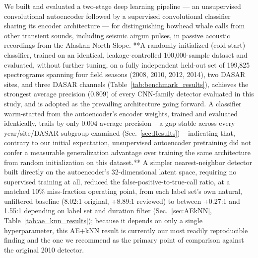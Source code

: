 \documentclass[preprint,NumberedRefs]{JASAnew}
\begin{document}
We built and evaluated a two-stage deep learning pipeline — an unsupervised
convolutional autoencoder followed by a supervised convolutional classifier
sharing its encoder architecture — for distinguishing bowhead whale calls
from other transient sounds, including seismic airgun pulses, in passive
acoustic recordings from the Alaskan North Slope. **A randomly-initialized
(cold-start) classifier, trained on an identical, leakage-controlled
100,000-sample dataset and evaluated, without further tuning, on a fully
independent held-out set of 199,825 spectrograms spanning four field seasons
(2008, 2010, 2012, 2014), two DASAR sites, and three DASAR channels
(Table~\ref{tab:benchmark_results}), achieves the strongest average
precision (0.809) of every CNN-family detector evaluated in this study, and
is adopted as the prevailing architecture going forward. A classifier
warm-started from the autoencoder's encoder weights, trained and evaluated
identically, trails by only 0.004 average precision -- a gap stable across
every year/site/DASAR subgroup examined (Sec.~\ref{sec:Results}) --
indicating that, contrary to our initial expectation, unsupervised
autoencoder pretraining did not confer a measurable generalization advantage
over training the same architecture from random initialization on this
dataset.** A simpler nearest-neighbor detector built
directly on the autoencoder's 32-dimensional latent space, requiring no
supervised training at all, reduced the false-positive-to-true-call ratio,
at a matched 10\% miss-fraction operating point, from each label set's own
natural, unfiltered baseline (8.02:1 original, {+}8.89:1 reviewed) to between
{+}0.27:1 and 1.55:1 depending on label set and duration filter
(Sec.~\ref{sec:AEkNN}, Table~\ref{tab:ae_knn_results}); because it depends on
only a single hyperparameter, this AE+kNN result is currently our most
readily reproducible finding and the one we recommend as the primary point
of comparison against the original 2010 detector.
\end{document}
